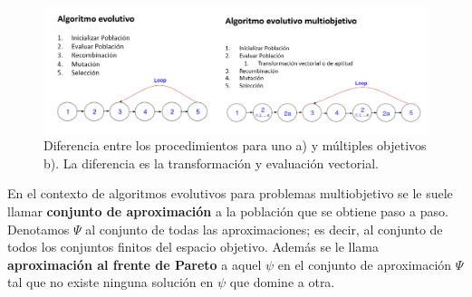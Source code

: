 \begin{figure}[H]
    \centering
    \includegraphics[width=\textwidth]{Figuras/MOEA_EA.png}
    \caption[EMOAs vs EAs]{Diferencia entre los procedimientos para uno a) y múltiples objetivos b). La diferencia es la transformación y evaluación vectorial. }
    \label{fig:EMOA_EA}
\end{figure}


En el contexto de algoritmos evolutivos para problemas multiobjetivo se le suele llamar \textbf{conjunto de aproximación} a la población que se obtiene paso a paso. Denotamos $\Psi$ al conjunto de todas las aproximaciones; es decir, al conjunto de todos los conjuntos finitos del espacio objetivo. Además se le llama \textbf{aproximación al frente de Pareto} a aquel $\psi$ en el conjunto de aproximación $\Psi$ tal que no existe ninguna solución en $\psi$ que domine a otra. 




